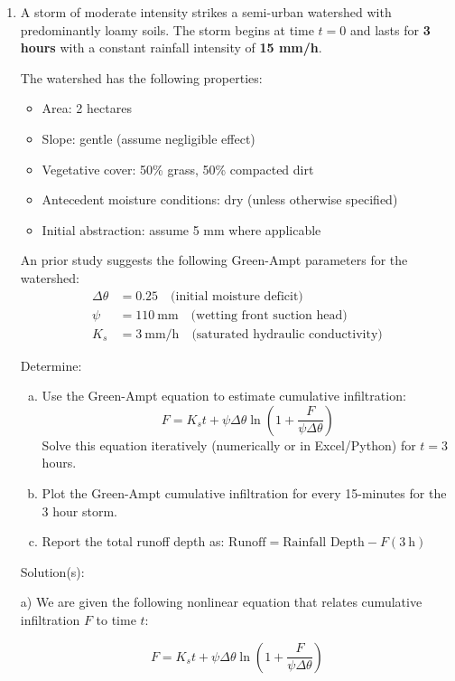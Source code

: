 \documentclass[12pt]{article}
\begin{document}
\begin{enumerate}
\clearpage
\item A storm of moderate intensity strikes a semi-urban watershed with predominantly loamy soils. The storm begins at time $ t = 0 $ and lasts for \textbf{3 hours} with a constant rainfall intensity of \textbf{15 mm/h}.

The watershed has the following properties:

\begin{itemize}
    \item Area: 2 hectares
    \item Slope: gentle (assume negligible effect)
    \item Vegetative cover: 50\% grass, 50\% compacted dirt
    \item Antecedent moisture conditions: dry (unless otherwise specified)
    \item Initial abstraction: assume 5 mm where applicable
\end{itemize}

An prior study suggests the following Green-Ampt parameters for the watershed:
\begin{align*}
    \Delta \theta &= 0.25 \quad \text{(initial moisture deficit)} \\
    \psi &= 110\ \text{mm} \quad \text{(wetting front suction head)} \\
    K_s &= 3\ \text{mm/h} \quad \text{(saturated hydraulic conductivity)}
\end{align*}

Determine:
\begin{enumerate}[a)]
     \item Use the Green-Ampt equation to estimate cumulative infiltration: 
     $$F = K_s t + \psi \Delta \theta \ln \left(1 + \frac{F}{\psi \Delta \theta} \right)$$ 
     Solve this equation iteratively (numerically or in Excel/Python) for $ t = 3 $ hours.
    \item Plot the Green-Ampt cumulative infiltration for every 15-minutes for the 3 hour storm.
    \item Report the total runoff depth as: $\text{Runoff} = \text{Rainfall Depth} - F(3\ \text{h})$
\end{enumerate}

Solution(s):

a) We are given the following nonlinear equation that relates cumulative infiltration \( F \) to time \( t \):

\[
F = K_s t + \psi \Delta \theta \ln \left(1 + \frac{F}{\psi \Delta \theta} \right)
\]


\end{enumerate}
\end{document}
